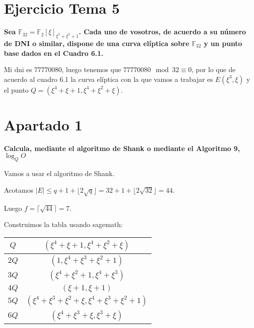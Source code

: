 \documentclass[a4paper]{article}
\title {\fbox{\Huge{\textbf{Ejercicio Tema 5}}}}
\author {\fbox{Ana Buendía Ruiz-Azuaga}}
\begin{document}
\maketitle


\section{Ejercicio Tema 5}

\textbf{Sea $\mathbb{F}_{32}=\mathbb{F}_{2}[\xi]_{\xi^5+\xi^2+1}$. Cada uno de vosotros, de acuerdo a su número de DNI o similar, dispone de una curva elíptica sobre $\mathbb{F}_{32}$ y un punto base dados en el Cuadro 6.1.}

Mi dni es 77770080, luego tenemos que $77770080 \mod 32 \equiv 0$, por lo que de acuerdo al cuadro 6.1 la curva elíptica con la que vamos a trabajar es $E(\xi^3, \xi)$ y el punto $Q=(\xi^4+\xi+1, \xi^4+\xi^2+\xi)$.

\section{Apartado 1}

\textbf{Calcula, mediante el algoritmo de Shank o mediante el Algoritmo 9, $\log_{Q}O$}

Vamos a usar el algoritmo de Shank.

Acotamos $|E| \leq q+1+\lfloor 2\sqrt{q}\rfloor = 32+1+\lfloor 2\sqrt{32}\rfloor = 44$.

Luego $f=\lceil \sqrt{44} \rceil = 7$.

Construimos la tabla usando sagemath:

\begin{table}[!h]
\begin{center}
\begin{tabular}{ |c|c| } 
 \hline
 $Q$ & $(\xi^4+\xi+1, \xi^4+\xi^2+\xi)$  \\
 \hline
 $2Q$ & $(1,\xi^4+\xi^3+\xi^2+1)$  \\ 
 \hline
 $3Q$ & $(\xi^4+\xi^2+1, \xi^4+\xi^3)$  \\ 
 \hline
 $4Q$ & $(\xi+1,\xi+1)$  \\ 
 \hline
 $5Q$ & $(\xi^4+\xi^3+\xi^2+\xi, \xi^4+\xi^3+\xi^2+1)$  \\ 
 \hline
 $6Q$ & $(\xi^4+\xi^3+\xi, \xi^3+\xi)$  \\ 
 \hline
\end{tabular}
\end{center}
\end{table}
\end{document}
